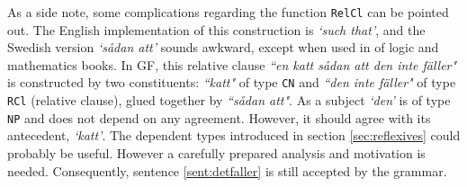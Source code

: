 \documentclass{report}
\begin{document}
%
As a side note, some complications regarding the function \verb-RelCl- can
be pointed out.
The English implementation of this construction is \emph{`such that'},
and the Swedish version \emph{`sådan att'} sounds awkward, except when used in of
logic and mathematics books.
In GF, this relative clause \emph{``en katt sådan att den inte fäller"} is constructed by
two constituents: \emph{``katt"}
of type \verb-CN- and \emph{``den inte fäller"} of type \verb-RCl- (relative clause), glued
together by \emph{``sådan att"}.
As a subject \emph{`den'} is of type \verb-NP- and does not depend on any
agreement. However, it should agree with its antecedent, \emph{`katt'}. 
 \label{sent:detfaller}
The dependent types introduced in section \ref{sec:reflexives} could probably be
useful.
However a carefully prepared analysis and motivation is needed. %
Consequently, sentence \ref{sent:detfaller} is still
accepted by the grammar.


\end{document}
